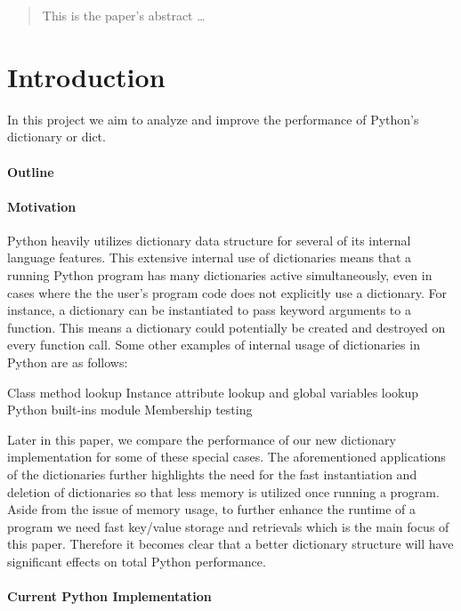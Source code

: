 \documentclass[12pt]{article}
\begin{document}
\maketitle

\begin{abstract}
This is the paper's abstract \ldots
\end{abstract}

\section{Introduction}
In this project we aim to analyze and improve the performance of Python’s dictionary or dict. 
\paragraph{Outline}


\paragraph{Motivation}
Python heavily utilizes dictionary data structure for several of its internal language features. This extensive internal use of dictionaries means that a running Python program has many dictionaries active simultaneously, even in cases where the the user’s program code does not explicitly use a dictionary. For instance, a dictionary can be instantiated to pass keyword arguments to a function. This means a dictionary could potentially be created and destroyed on every function call.  Some other examples of internal usage of dictionaries in Python are as follows:

Class method lookup
Instance attribute lookup and global variables lookup
Python built-ins module
Membership testing

Later in this paper, we compare the performance of our new dictionary implementation for some of these special cases. The aforementioned applications of the dictionaries further highlights the need for the fast instantiation and deletion of dictionaries so that less memory is utilized once running a program. Aside from the issue of memory usage, to further enhance the runtime of a program we need fast key/value storage and retrievals which is the main focus of this paper. Therefore it becomes clear that a better dictionary structure will have significant effects on total Python performance.

\paragraph{Current Python Implementation
}
\end{document}
